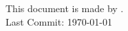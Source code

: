 \documentclass{article}
\begin{document}
\maketitle
\vspace{4em}
\begin{center}
    This document is made by \XeLaTeX{}.\\
    \vspace{\baselineskip}
    {\textcolor{darkpurple}{Last Commit: \today}} 
\end{center}
\vspace{5em}
\tableofcontents
\newpage

\newpage

\end{document}
